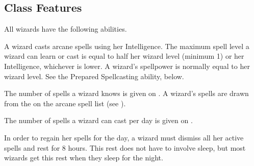\subsection{Class Features}
All wizards have the following abilities.

A wizard casts arcane spells using her Intelligence.
The maximum spell level a wizard can learn or cast is equal to half her wizard level (minimum 1) or her Intelligence, whichever is lower.
A wizard's spellpower is normally equal to her wizard level.
See the Prepared Spellcasting ability, below.

The number of spells a wizard knows is given on .
A wizard's spells are drawn from the  on the arcane spell list (see ).

The number of spells a wizard can cast per day is given on .

In order to regain her spells for the day, a wizard must dismiss all her active spells and rest for 8 hours.
This rest does not have to involve sleep, but most wizards get this rest when they sleep for the night.

